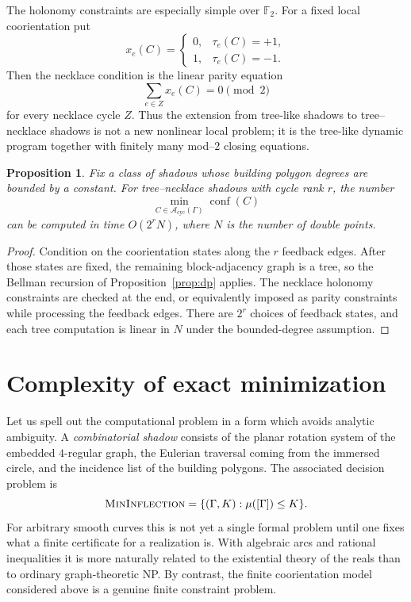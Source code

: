 \documentclass[11pt]{article}
\newtheorem{proposition}[theorem]{Proposition}
\newcommand{\A}{\mathcal A}
\newcommand{\conf}{\operatorname{conf}}
\newcommand{\cyc}{\mathrm{cyc}}
\newcommand{\Ftwo}{\mathbb F_2}
\begin{document}
The holonomy constraints are especially simple over $\Ftwo$.  For a fixed local coorientation put
\[
 x_e(C)=
 \begin{cases}
 0,&\tau_e(C)=+1,\\
 1,&\tau_e(C)=-1.
 \end{cases}
\]
Then the necklace condition is the linear parity equation
\[
 \sum_{e\in Z}x_e(C)=0\pmod 2
\]
for every necklace cycle $Z$.  Thus the extension from tree-like shadows to tree--necklace shadows is not a new nonlinear local problem; it is the tree-like dynamic program together with finitely many mod--$2$ closing equations.

\begin{proposition}\label{prop:feedbackdp}
Fix a class of shadows whose building polygon degrees are bounded by a constant.  For tree--necklace shadows with cycle rank $r$, the number
\[
 \min_{C\in\A_{\cyc}(\Gamma)}\conf(C)
\]
can be computed in time $O(2^r N)$, where $N$ is the number of double points.
\end{proposition}

\begin{proof}
Condition on the coorientation states along the $r$ feedback edges.  After those states are fixed, the remaining block-adjacency graph is a tree, so the Bellman recursion of Proposition~\ref{prop:dp} applies.  The necklace holonomy constraints are checked at the end, or equivalently imposed as parity constraints while processing the feedback edges.  There are $2^r$ choices of feedback states, and each tree computation is linear in $N$ under the bounded-degree assumption.
\end{proof}





\section{Complexity of exact minimization}

Let us spell out the computational problem in a form which avoids analytic ambiguity.  A \emph{combinatorial shadow} consists of the planar rotation system of the embedded $4$-regular graph, the Eulerian traversal coming from the immersed circle, and the incidence list of the building polygons.  The associated decision problem is
\[
 \textsc{MinInflection}=\{(\Gamma,K):\mu([\Gamma])\le K\}.
\]
For arbitrary smooth curves this is not yet a single formal problem until one fixes what a finite certificate for a realization is.  With algebraic arcs and rational inequalities it is more naturally related to the existential theory of the reals than to ordinary graph-theoretic NP.  By contrast, the finite coorientation model considered above is a genuine finite constraint problem.
\end{document}
